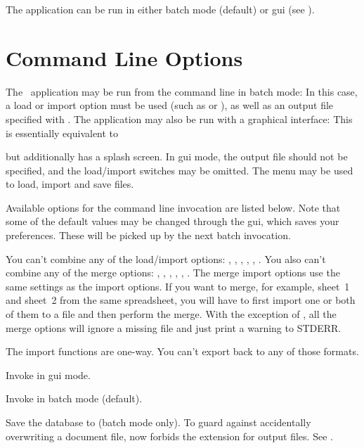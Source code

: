 The  application can be run in either 
batch mode (default) or \gls{gui} (see ).

\section{Command Line Options}
\label{sec:commandoptions}

The \appname\ application may be run from the command line in batch
mode:
In this case, a load or import option must be used (such as
 or ), as well as an output file specified
with . The application may also be run with a
graphical interface:
This is essentially equivalent to
\begin{terminal}
  
\end{terminal}
but additionally has a splash screen. In \gls{gui} mode, the output
file should not be specified, and the load\slash import switches may
be omitted. The  menu may be used to load, import and
save files.

Available options for the command line invocation are listed below.
Note that some of the default values may be changed through the
\gls{gui}, which saves your preferences.  These will be picked up by
the next batch invocation.

You can't combine any of the load/import options: ,
, , , ,
. You also can't combine any of the merge options:
, , ,
, , .
The merge import options use the same settings as the import
options. If you want to merge, for example, sheet~1 and sheet~2 from
the same spreadsheet, you will have to first import one or both of
them to a  file and then perform the merge.  With the
exception of , all the merge options will ignore a
missing file and just print a warning to STDERR.

The import functions are one-way. You can't export back to any of 
those formats.

Invoke  in \gls{gui} mode.

Invoke  in batch mode (default).

Save the database to  (batch mode only).
To guard against accidentally overwriting a document file, 
now forbids the  extension for output files. See
.

